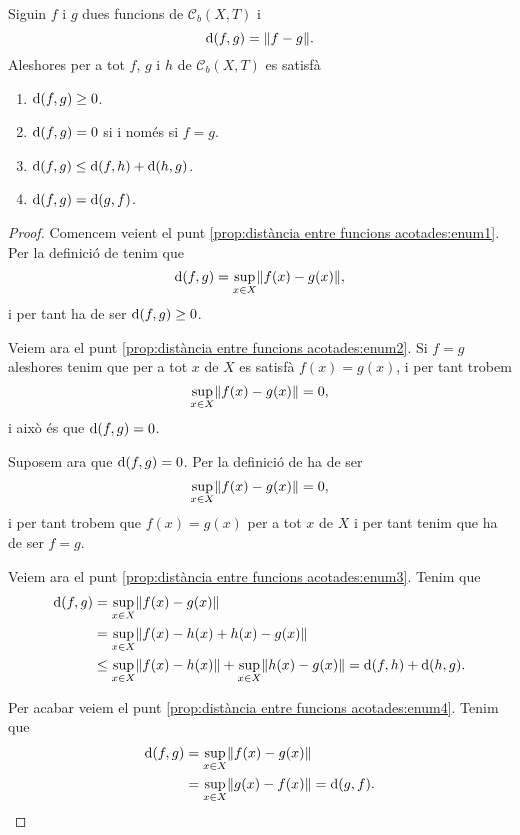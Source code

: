 \documentclass[../../Main.tex]{subfiles}
\begin{document}
	\begin{proposition}
		\label{prop:distància entre funcions acotades}
		Siguin \(f\) i \(g\) dues funcions de \(\mathcal{C}_{b}(X,T)\) i
		\[
		    \distancia(f,g)=\norm{f-g}.
		\]
		Aleshores per a tot \(f\), \(g\) i \(h\) de \(\mathcal{C}_{b}(X,T)\) es satisfà
		\begin{enumerate}
			\item\label{prop:distància entre funcions acotades:enum1} \(\operatorname{d}(f,g)\geq0\).
			\item\label{prop:distància entre funcions acotades:enum2} \(\operatorname{d}(f,g)=0\) si i només si \(f=g\).
			\item\label{prop:distància entre funcions acotades:enum3} \(\operatorname{d}(f,g)\leq\operatorname{d}(f,h)+\operatorname{d}(h,g)\).
			\item\label{prop:distància entre funcions acotades:enum4} \(\operatorname{d}(f,g)=\operatorname{d}(g,f)\).
		\end{enumerate}
		\begin{proof}
			Comencem veient el punt \eqref{prop:distància entre funcions acotades:enum1}.
			Per la definició de  tenim que
			\[
			    \distancia(f,g)=\sup_{x\in X}\norm{f(x)-g(x)},
			\]
			i per tant ha de ser \(\operatorname{d}(f,g)\geq0\).
			
			Veiem ara el punt \eqref{prop:distància entre funcions acotades:enum2}.
			Si \(f=g\) aleshores tenim que per a tot \(x\) de \(X\) es satisfà \(f(x)=g(x)\), i per tant trobem
			\[
			    \sup_{x\in X}\norm{f(x)-g(x)}=0,
			\]
			i això és que \(\operatorname{d}(f,g)=0\).
			
			Suposem ara que \(\operatorname{d}(f,g)=0\).
			Per la definició de  ha de ser
			\[
			    \sup_{x\in X}\norm{f(x)-g(x)}=0,
			\]
			i per tant trobem que \(f(x)=g(x)\) per a tot \(x\) de \(X\) i per tant tenim que ha de ser \(f=g\).
			
			Veiem ara el punt \eqref{prop:distància entre funcions acotades:enum3}.
			Tenim que
			\begin{align*}
				\distancia(f,g)&=\sup_{x\in X}\norm{f(x)-g(x)} \\
				&=\sup_{x\in X}\norm{f(x)-h(x)+h(x)-g(x)} \\
				&\leq\sup_{x\in X}\norm{f(x)-h(x)}+\sup_{x\in X}\norm{h(x)-g(x)}=\distancia(f,h)+\distancia(h,g).
			\end{align*}
			
			Per acabar veiem el punt \eqref{prop:distància entre funcions acotades:enum4}.
			Tenim que
			\begin{align*}
				\distancia(f,g)&=\sup_{x\in X}\norm{f(x)-g(x)} \\
				&=\sup_{x\in X}\norm{g(x)-f(x)}=\distancia(g,f).\qedhere
			\end{align*}
		\end{proof}
	\end{proposition}
\end{document}
